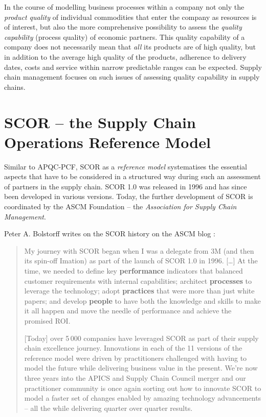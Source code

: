 \documentclass[11pt,a4paper]{article}
\begin{document}
In the course of modelling business processes within a company not only the
\emph{product quality} of individual commodities that enter the company as
resources is of interest, but also the more comprehensive possibility to
assess the \emph{quality capability} (process quality) of economic partners.
This quality capability of a company does not necessarily mean that \emph{all}
its products are of high quality, but in addition to the average high quality
of the products, adherence to delivery dates, costs and service within narrow
predictable ranges can be expected. Supply chain management focuses on such
issues of assessing quality capability in supply chains.

\section{SCOR -- the Supply Chain Operations Reference Model}

Similar to APQC-PCF, SCOR as a \emph{reference model} systematises the
essential aspects that have to be considered in a structured way during such
an assessment of partners in the supply chain.  SCOR 1.0 was released in 1996
and has since been developed in various versions. Today, the further
development of SCOR is coordinated by the ASCM Foundation -- the
\emph{Association for Supply Chain Management}.

Peter A. Bolstorff writes on the SCOR history on the ASCM blog
\cite{Bolstorff2017}:
\begin{quote}
  My journey with SCOR began when I was a delegate from 3M (and then its
  spin-off Imation) as part of the launch of SCOR 1.0 in 1996. [\ldots] At the
  time, we needed to define key \textbf{performance} indicators that balanced
  customer requirements with internal capabilities; architect
  \textbf{processes} to leverage the technology; adopt \textbf{practices} that
  were more than just white papers; and develop \textbf{people} to have both
  the knowledge and skills to make it all happen and move the needle of
  performance and achieve the promised ROI.

  [Today] over 5\,000 companies have leveraged SCOR as part of their supply
  chain excellence journey. Innovations in each of the 11 versions of the
  reference model were driven by practitioners challenged with having to model
  the future while delivering business value in the present. We’re now three
  years into the APICS and Supply Chain Council merger and our practitioner
  community is once again sorting out how to innovate SCOR to model a faster
  set of changes enabled by amazing technology advancements – all the while
  delivering quarter over quarter results.
\end{quote}
\end{document}
